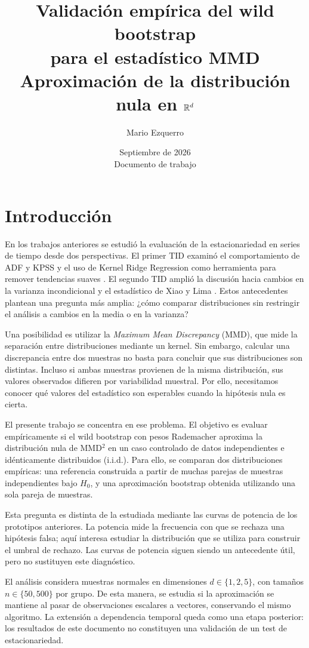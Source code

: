 \documentclass[11pt,a4paper]{article}
\title{Validación empírica del wild bootstrap\\para el estadístico MMD\\[0.25em]\large Aproximación de la distribución nula en $\mathbb{R}^d$}
\author{Mario Ezquerro}
\date{Septiembre de 2026\\\small Documento de trabajo}
\begin{document}
\renewcommand{\tablename}{Tabla}
\maketitle

\section{Introducción}
En los trabajos anteriores se estudió la evaluación de la estacionariedad en series de tiempo desde dos perspectivas. El primer TID examinó el comportamiento de ADF y KPSS y el uso de Kernel Ridge Regression como herramienta para remover tendencias suaves \cite{tid1}. El segundo TID amplió la discusión hacia cambios en la varianza incondicional y el estadístico de Xiao y Lima \cite{tid2}. Estos antecedentes plantean una pregunta más amplia: ¿cómo comparar distribuciones sin restringir el análisis a cambios en la media o en la varianza?

Una posibilidad es utilizar la \textit{Maximum Mean Discrepancy} (MMD), que mide la separación entre distribuciones mediante un kernel. Sin embargo, calcular una discrepancia entre dos muestras no basta para concluir que sus distribuciones son distintas. Incluso si ambas muestras provienen de la misma distribución, sus valores observados difieren por variabilidad muestral. Por ello, necesitamos conocer qué valores del estadístico son esperables cuando la hipótesis nula es cierta.

El presente trabajo se concentra en ese problema. El objetivo es evaluar empíricamente si el wild bootstrap con pesos Rademacher aproxima la distribución nula de MMD$^2$ en un caso controlado de datos independientes e idénticamente distribuidos (i.i.d.). Para ello, se comparan dos distribuciones empíricas: una referencia construida a partir de muchas parejas de muestras independientes bajo $H_0$, y una aproximación bootstrap obtenida utilizando una sola pareja de muestras.

Esta pregunta es distinta de la estudiada mediante las curvas de potencia de los prototipos anteriores. La potencia mide la frecuencia con que se rechaza una hipótesis falsa; aquí interesa estudiar la distribución que se utiliza para construir el umbral de rechazo. Las curvas de potencia siguen siendo un antecedente útil, pero no sustituyen este diagnóstico.

El análisis considera muestras normales en dimensiones $d\in\{1,2,5\}$, con tamaños $n\in\{50,500\}$ por grupo. De esta manera, se estudia si la aproximación se mantiene al pasar de observaciones escalares a vectores, conservando el mismo algoritmo. La extensión a dependencia temporal queda como una etapa posterior: los resultados de este documento no constituyen una validación de un test de estacionariedad.
\end{document}
